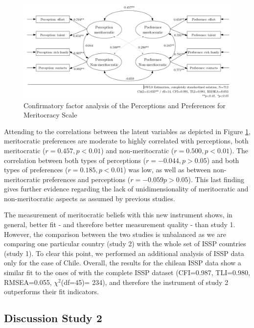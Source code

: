\documentclass[
  10pt,
  a4paper,
]{article}
\begin{document}
\begin{figure}[H]

{\centering \includegraphics[width=0.85\linewidth]{output/images/figure9} 

}

\caption{Confirmatory factor analysis of the Perceptions and Preferences for Meritocracy Scale}\label{fig:meas02}
\end{figure}

Attending to the correlations between the latent variables as depicted in Figure \ref{fig:meas02}, meritocratic preferences are moderate to highly correlated with perceptions, both meritocratic (\(r=0.457,p<0.01\)) and non-meritocratic (\(r=0.500,p<0.01\)). The correlation between both types of perceptions (\(r=-0.044,p>0.05\)) and both types of preferences (\(r=0.185,p<0.01\)) was low, as well as between non-meritocratic preferences and perceptions (\(r=-0.059p>0.05\)). This last finding gives further evidence regarding the lack of unidimensionality of meritocratic and non-meritocratic aspects as assumed by previous studies.

The measurement of meritocratic beliefs with this new instrument shows, in general, better fit - and therefore better measurement quality - than study 1. However, the comparison between the two studies is unbalanced as we are comparing one particular country (study 2) with the whole set of ISSP countries (study 1). To clear this point, we performed an additional analysis of ISSP data only for the case of Chile. Overall, the results for the chilean ISSP data show a similar fit to the ones of with the complete ISSP dataset (CFI=0.987, TLI=0.980, RMSEA=0.055, \(\chi^2\)(df=45)= 234), and therefore the instrument of study 2 outperforms their fit indicators.

\subsection{Discussion Study 2}\label{discussion-study-2}
\end{document}
